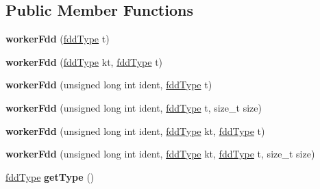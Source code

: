 \subsection*{Public Member Functions}
\begin{DoxyCompactItemize}
\item 
\hypertarget{classfaster_1_1workerFdd_a93ad6099e1b600358729aa45952c6ac9}{}\label{classfaster_1_1workerFdd_a93ad6099e1b600358729aa45952c6ac9} 
{\bfseries worker\+Fdd} (\hyperlink{namespacefaster_aa8898687bc64536b60a3d5f365060cd6}{fdd\+Type} t)
\item 
\hypertarget{classfaster_1_1workerFdd_aa07a10094bc1f054d2bb5fe89f3c2379}{}\label{classfaster_1_1workerFdd_aa07a10094bc1f054d2bb5fe89f3c2379} 
{\bfseries worker\+Fdd} (\hyperlink{namespacefaster_aa8898687bc64536b60a3d5f365060cd6}{fdd\+Type} kt, \hyperlink{namespacefaster_aa8898687bc64536b60a3d5f365060cd6}{fdd\+Type} t)
\item 
\hypertarget{classfaster_1_1workerFdd_a4d9f824ec396f44f4876f39f665c719b}{}\label{classfaster_1_1workerFdd_a4d9f824ec396f44f4876f39f665c719b} 
{\bfseries worker\+Fdd} (unsigned long int ident, \hyperlink{namespacefaster_aa8898687bc64536b60a3d5f365060cd6}{fdd\+Type} t)
\item 
\hypertarget{classfaster_1_1workerFdd_a592fd4bca2d66794987a8084c80e3248}{}\label{classfaster_1_1workerFdd_a592fd4bca2d66794987a8084c80e3248} 
{\bfseries worker\+Fdd} (unsigned long int ident, \hyperlink{namespacefaster_aa8898687bc64536b60a3d5f365060cd6}{fdd\+Type} t, size\+\_\+t size)
\item 
\hypertarget{classfaster_1_1workerFdd_af9f296569b13b1c548658eb083c86104}{}\label{classfaster_1_1workerFdd_af9f296569b13b1c548658eb083c86104} 
{\bfseries worker\+Fdd} (unsigned long int ident, \hyperlink{namespacefaster_aa8898687bc64536b60a3d5f365060cd6}{fdd\+Type} kt, \hyperlink{namespacefaster_aa8898687bc64536b60a3d5f365060cd6}{fdd\+Type} t)
\item 
\hypertarget{classfaster_1_1workerFdd_afc006b52499d50841f0a0aedd19331b3}{}\label{classfaster_1_1workerFdd_afc006b52499d50841f0a0aedd19331b3} 
{\bfseries worker\+Fdd} (unsigned long int ident, \hyperlink{namespacefaster_aa8898687bc64536b60a3d5f365060cd6}{fdd\+Type} kt, \hyperlink{namespacefaster_aa8898687bc64536b60a3d5f365060cd6}{fdd\+Type} t, size\+\_\+t size)
\item 
\hypertarget{classfaster_1_1workerFdd_ab514e2448a2cce4fba81ad9c0a416bc2}{}\label{classfaster_1_1workerFdd_ab514e2448a2cce4fba81ad9c0a416bc2} 
\hyperlink{namespacefaster_aa8898687bc64536b60a3d5f365060cd6}{fdd\+Type} {\bfseries get\+Type} ()

\end{DoxyCompactItemize}
